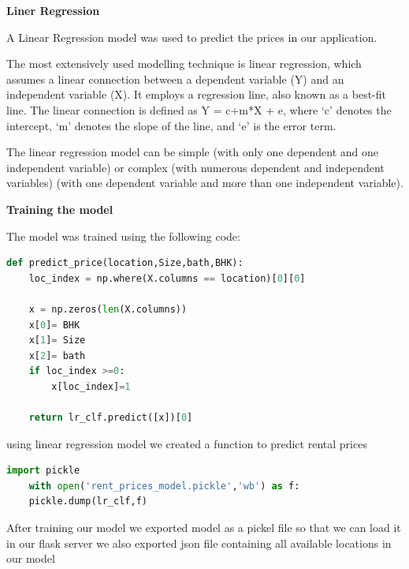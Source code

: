 \noindent\textbf{Liner Regression}\par
\noindent\medskip
A Linear Regression model was used to predict the prices in our application.\par
\medskip
The most extensively used modelling technique is linear regression, which assumes a linear connection between a dependent variable (Y) and an independent variable (X). It employs a regression line, also known as a best-fit line. The linear connection is defined as Y = c+m*X + e, where ‘c’ denotes the intercept, ‘m’ denotes the slope of the line, and ‘e’ is the error term.\par
\medskip
The linear regression model can be simple (with only one dependent and one independent variable) or complex (with numerous dependent and independent variables) (with one dependent variable and more than one independent variable).

\medskip
\noindent\textbf{Training the model}\par\medskip
\noindent\medskip
The model was trained using the following code:

\begin{lstlisting}[language=python]
    def predict_price(location,Size,bath,BHK):
    loc_index = np.where(X.columns == location)[0][0]
    
    x = np.zeros(len(X.columns))
    x[0]= BHK
    x[1]= Size
    x[2]= bath 
    if loc_index >=0:
        x[loc_index]=1
    
    return lr_clf.predict([x])[0]
\end{lstlisting}

using linear regression model we created a function to predict rental prices
\begin{lstlisting}[language=python]
    import pickle
    with open('rent_prices_model.pickle','wb') as f:
    pickle.dump(lr_clf,f)
\end{lstlisting}

\medskip
\noindent
After training our model we exported model as a pickel file so that we can load it in our flask server
we also exported json file containing all available locations in our model

